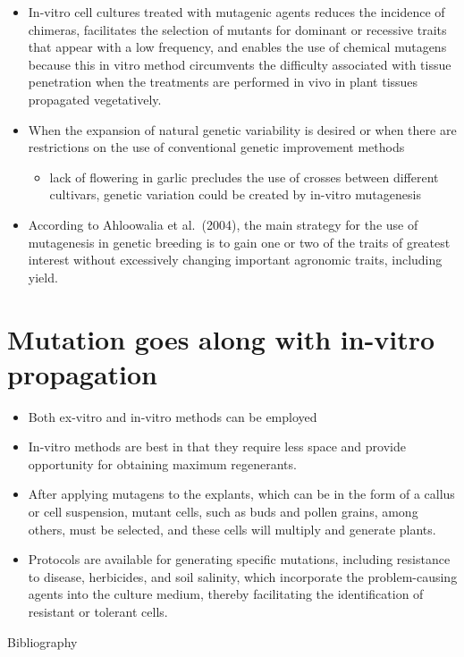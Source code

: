 \documentclass[11pt,ignorenonframetext,aspectratio=169]{beamer}
\newif\ifbibliography
\providecommand{\tightlist}{%
  \setlength{\itemsep}{0pt}\setlength{\parskip}{0pt}}
\begin{document}
\begin{frame}{}
\protect\hypertarget{section-7}{}
\begin{itemize}
\tightlist
\item
  In-vitro cell cultures treated with mutagenic agents reduces the
  incidence of chimeras, facilitates the selection of mutants for
  dominant or recessive traits that appear with a low frequency, and
  enables the use of chemical mutagens because this in vitro method
  circumvents the difficulty associated with tissue penetration when the
  treatments are performed in vivo in plant tissues propagated
  vegetatively.
\item
  When the expansion of natural genetic variability is desired or when
  there are restrictions on the use of conventional genetic improvement
  methods

  \begin{itemize}
  \tightlist
  \item
    lack of flowering in garlic precludes the use of crosses between
    different cultivars, genetic variation could be created by in-vitro
    mutagenesis
  \end{itemize}
\item
  According to Ahloowalia et al.~(2004), the main strategy for the use
  of mutagenesis in genetic breeding is to gain one or two of the traits
  of greatest interest without excessively changing important agronomic
  traits, including yield.
\end{itemize}
\end{frame}

\hypertarget{mutation-goes-along-with-in-vitro-propagation}{%
\section{Mutation goes along with in-vitro
propagation}\label{mutation-goes-along-with-in-vitro-propagation}}

\begin{frame}{}
\protect\hypertarget{section-8}{}
\begin{itemize}
\tightlist
\item
  Both ex-vitro and in-vitro methods can be employed
\item
  In-vitro methods are best in that they require less space and provide
  opportunity for obtaining maximum regenerants.
\item
  After applying mutagens to the explants, which can be in the form of a
  callus or cell suspension, mutant cells, such as buds and pollen
  grains, among others, must be selected, and these cells will multiply
  and generate plants.
\item
  Protocols are available for generating specific mutations, including
  resistance to disease, herbicides, and soil salinity, which
  incorporate the problem-causing agents into the culture medium,
  thereby facilitating the identification of resistant or tolerant
  cells.
\end{itemize}
\end{frame}

                    \renewcommand\refname{Bibliography}
              \begin{frame}[allowframebreaks]{Bibliography}
    \bibliographytrue
    
    \end{frame}
  
\end{document}

